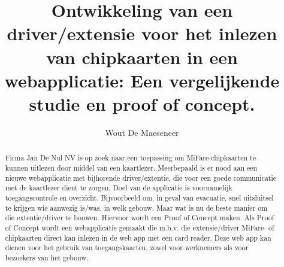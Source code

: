 \documentclass{hogent-article}
\title{Ontwikkeling van een driver/extensie voor het inlezen van chipkaarten in een webapplicatie: Een vergelijkende studie en proof of concept.}
\author{Wout De Maeseneer}
\begin{document}
    
    \begin{abstract}
        Firma Jan De Nul NV is op zoek naar een toepassing om MiFare-chipkaarten te kunnen uitlezen door middel van een kaartlezer. Meerbepaald is er nood aan een nieuwe webapplicatie met bijhorende driver/extentie, die voor een goede communicatie met de kaartlezer dient te zorgen.
        Doel van de applicatie is voornamelijk toegangscontrole en overzicht. Bijvoorbeeld om, in geval van evacuatie, snel uitsluitsel te krijgen wie aanwezig is/was, in welk gebouw.
        Maar wat is nu de beste manier om die extentie/driver te bouwen. Hiervoor wordt een Proof of Concept maken.
        Als Proof of Concept wordt een webapplicatie gemaakt die m.b.v. die extensie/driver MiFare- of chipkaarten direct kan inlezen in de web app met een card reader. Deze web app kan dienen voor het gebruik van toegangskaarten, zowel voor werknemers als voor bezoekers van het gebouw.
    \end{abstract}
    
    \tableofcontents
    
    
    
    \printbibliography[heading=bibintoc]
    
    
\end{document}
